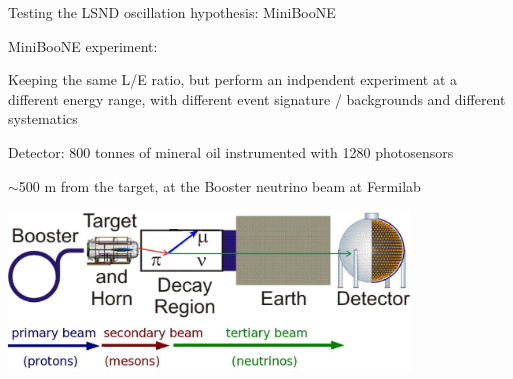 %
%
%

\begin{frame}[t]{Testing the LSND oscillation hypothesis: MiniBooNE}

{\small
MiniBooNE experiment:
\begin{itemize}
 {\small
  \item Keeping the same L/E ratio, but perform an indpendent experiment at a different energy range,
        with different event signature / backgrounds and different systematics\\
  \item Detector: 800 tonnes of mineral oil instrumented with 1280 photosensors\\
  \item $\sim$500 m from the target, at the Booster neutrino beam at Fermilab\\
 }
\end{itemize}
}
\begin{center}
 \includegraphics[width=0.80\textwidth]{./images/beyond3nu/accelerator/miniboone.png}\\
\end{center}
\end{frame}

%
%
%

